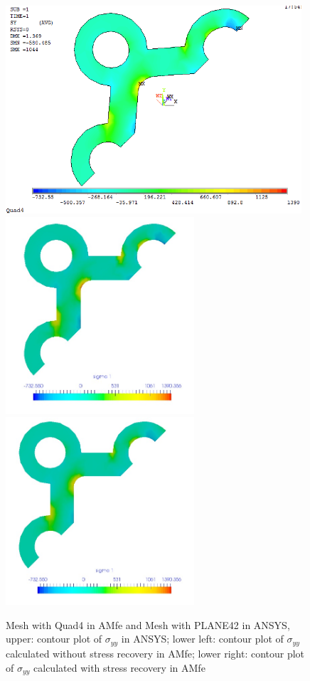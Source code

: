 \begin{figure}[htbp]
	\begin{center}
		\includegraphics[width=11cm,clip]{Quad4_Syy.png} 
		\includegraphics[width=7cm,clip]{Quad4_Syy_PD.png} 			
		\includegraphics[width=7cm,clip]{Quad4_Syy_P.png} 		
		\caption{Mesh with Quad4 in AMfe and Mesh with PLANE42 in ANSYS, upper: contour plot of $\sigma_{yy}$ in ANSYS; lower left: contour plot of $\sigma_{yy}$ calculated without stress recovery in AMfe; lower right: contour plot of $\sigma_{yy}$ calculated with stress recovery in AMfe} \label{fig: Quad4_Syy}
	\end{center}
\end{figure}
\clearpage 

